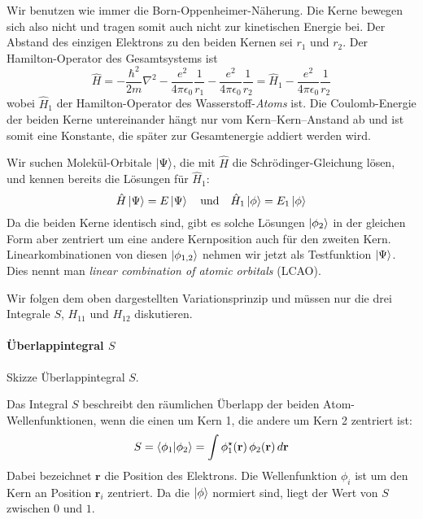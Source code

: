 Wir benutzen wie immer die Born-Oppenheimer-Näherung. Die Kerne bewegen sich also nicht und tragen somit auch nicht zur kinetischen Energie bei. Der Abstand des einzigen Elektrons zu den beiden Kernen sei $r_1$ und $r_2$. Der Hamilton-Operator des Gesamtsystems ist
\begin{equation}
\hat{H} =  - \frac{\hbar^2}{2 m} \nabla^2 - \frac{e^2}{4 \pi \epsilon_0} \frac{1}{r_{1}} - \frac{e^2}{4 \pi \epsilon_0} \frac{1}{r_{2}}
= \hat{H}_1  - \frac{e^2}{4 \pi \epsilon_0} \frac{1}{r_{2}}
\end{equation} 
wobei $\hat{H}_1 $ der Hamilton-Operator des Wasserstoff-\emph{Atoms} ist. Die Coulomb-Energie der beiden Kerne untereinander hängt nur vom Kern--Kern--Anstand ab und ist somit eine Konstante, die später zur Gesamtenergie addiert werden wird.

Wir suchen Molekül-Orbitale $\ket{\Psi}$, die mit $\hat{H}$ die Schrödinger-Gleichung lösen, und kennen bereits die Lösungen für $\hat{H}_1$:
\begin{equation}
\hat{H} \ket{\Psi} = E \ket{\Psi} \quad \text{und} \quad 
\hat{H}_1 \ket{\phi} = E_1 \ket{\phi} 
\end{equation}
Da die beiden Kerne identisch sind, gibt es solche Lösungen $\ket{\phi_2}$ in der gleichen Form aber zentriert um eine andere Kernposition auch für den zweiten Kern. Linearkombinationen von diesen  $\ket{\phi_{1,2}}$ nehmen wir jetzt als Testfunktion $\ket{\Psi}$. Dies nennt man \emph{linear combination of atomic orbitals} (LCAO).

Wir folgen dem oben dargestellten Variationsprinzip und müssen nur die drei Integrale $S$, $ H_{11}$ und $H_{12}$ diskutieren.

\paragraph{Überlappintegral $S$} 
\begin{marginfigure}
\caption{Skizze   Überlappintegral $S$. }
\end{marginfigure}
%
Das Integral $S$ beschreibt den räumlichen Überlapp der beiden Atom-Wellenfunktionen, wenn die einen um Kern 1, die andere um Kern 2 zentriert ist:
\begin{equation}
 S = \braket{\phi_1 | \phi_2} = \int \phi_1^\star( \mathbf{r} )  \, \phi_2( \mathbf{r})   \, d\mathbf{r}
\end{equation}
Dabei bezeichnet $\mathbf{r}$ die Position des Elektrons. Die Wellenfunktion $\phi_i$ ist um den Kern an Position $\mathbf{r}_{i}$ zentriert. Da die $\ket{\phi}$ normiert sind, liegt der Wert von $S$ zwischen $0$ und $1$.





